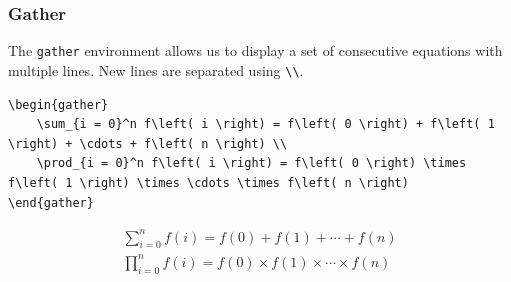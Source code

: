 \documentclass[11pt, twoside]{article}
\begin{document}
\subsubsection{Gather}
The \lstinline{gather} environment allows us to display a set of consecutive equations with multiple lines.
New lines are separated using \lstinline|\\|.
\begin{lstlisting}
\begin{gather}
    \sum_{i = 0}^n f\left( i \right) = f\left( 0 \right) + f\left( 1 \right) + \cdots + f\left( n \right) \\
    \prod_{i = 0}^n f\left( i \right) = f\left( 0 \right) \times f\left( 1 \right) \times \cdots \times f\left( n \right)
\end{gather}
\end{lstlisting}
\begin{outputbox}
    \begin{gather}
        \sum_{i = 0}^n f\left( i \right) = f\left( 0 \right) + f\left( 1 \right) + \cdots + f\left( n \right) \\
        \prod_{i = 0}^n f\left( i \right) = f\left( 0 \right) \times f\left( 1 \right) \times \cdots \times f\left( n \right)
    \end{gather}
\end{outputbox}
\newpage
\end{document}
